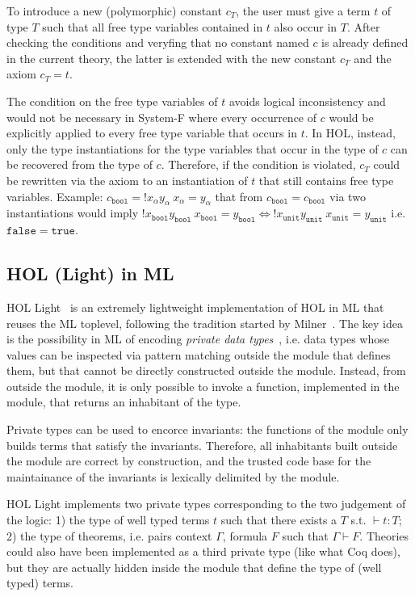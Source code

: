 \documentclass[preprint]{sigplanconf}
\begin{document}
To introduce a new (polymorphic) constant $c_T$, the user must give a term $t$
of type $T$ such that all free type variables contained in $t$ also occur in
$T$. After checking the conditions and veryfing that no constant named $c$ is already defined in the current theory, the latter is extended with the new
constant $c_T$ and the axiom $c_T = t$.

The condition on the free type variables of $t$ avoids logical inconsistency
and would not be necessary in System-F where every occurrence of $c$ would be explicitly applied to every free type variable that occurs in $t$. In HOL, instead, only the type instantiations for the type variables that occur in the type of $c$ can be recovered from the type of $c$. Therefore, if the condition is violated, $c_T$ could be rewritten via the axiom to an instantiation of $t$ that still contains free type variables. Example: $c_\mathtt{bool} = ! x_\alpha y_\alpha \  x_\alpha = y_\alpha$ that from $c_\mathtt{bool} = c_\mathtt{bool}$ via two instantiations would imply $! x_\mathtt{bool} y_\mathtt{bool} \  x_\mathtt{bool}= y_\mathtt{bool} \iff ! x_\mathtt{unit} y_\mathtt{unit} \  x_\mathtt{unit}= y_\mathtt{unit}$ i.e. $\mathtt{false} = \mathtt{true}$.

\subsection{HOL (Light) in ML}
HOL Light~\cite{hol1} is an extremely lightweight implementation of HOL in ML that reuses the ML toplevel, following the tradition started by Milner~\cite{milner1}. The key idea is the possibility in ML of encoding \emph{private data types}~\cite{leroy1}, i.e. data types whose values can be inspected via pattern matching outside the module that defines them, but that cannot be directly constructed outside the module. Instead, from outside the module, it is only possible to invoke a function, implemented in the module, that returns an inhabitant of the type.

Private types can be used to encorce invariants: the functions of the module only builds terms that satisfy the invariants. Therefore, all inhabitants built outside the module are correct by construction, and the trusted code base for the maintainance of the invariants is lexically delimited by the module.

HOL Light implements two private types corresponding to the two judgement of the logic: 1) the type of well typed terms $t$ such that there exists a $T$ s.t. $\vdash t : T$; 2) the type of theorems, i.e. pairs context $\Gamma$, formula $F$ such that $\Gamma \vdash F$. Theories could also have been implemented as a third private type (like what Coq does), but they are actually hidden inside the module that define the type of (well typed) terms.
\end{document}
